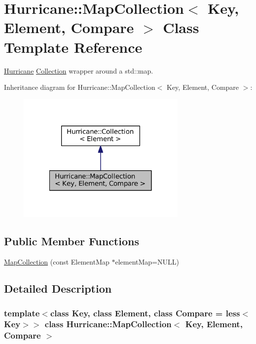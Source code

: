 \hypertarget{classHurricane_1_1MapCollection}{}\section{Hurricane\+:\+:Map\+Collection$<$ Key, Element, Compare $>$ Class Template Reference}
\label{classHurricane_1_1MapCollection}


\mbox{\hyperlink{namespaceHurricane}{Hurricane}} \mbox{\hyperlink{classHurricane_1_1Collection}{Collection}} wrapper around a std\+::map.  




Inheritance diagram for Hurricane\+:\+:Map\+Collection$<$ Key, Element, Compare $>$\+:\nopagebreak
\begin{figure}[H]
\begin{center}
\leavevmode
\includegraphics[width=234pt]{classHurricane_1_1MapCollection__inherit__graph}
\end{center}
\end{figure}
\subsection*{Public Member Functions}
\begin{DoxyCompactItemize}
\item 
\mbox{\hyperlink{classHurricane_1_1MapCollection_a0b905fb46ced35815132e5eab62a8de1}{Map\+Collection}} (const Element\+Map $\ast$element\+Map=N\+U\+LL)
\end{DoxyCompactItemize}


\subsection{Detailed Description}
\subsubsection*{template$<$class Key, class Element, class Compare = less$<$\+Key$>$$>$\newline
class Hurricane\+::\+Map\+Collection$<$ Key, Element, Compare $>$}

